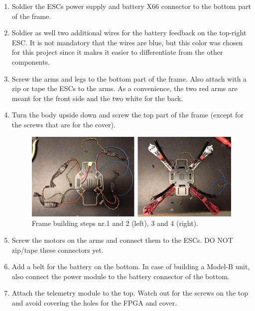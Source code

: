 \begin{enumerate}
    \item Soldier the ESCs power supply and battery X66 connector to the bottom part of the frame.
    
    \item Soldier as well two additional wires for the battery feedback on the top-right ESC. It is not mandatory that the wires are blue, but this color was chosen for this project since it makes it easier to differentiate from the other components.
    
    \item Screw the arms and legs to the bottom part of the frame. Also attach with a zip or tape the ESCs to the arms. As a convenience, the two red arms are meant for the front side and the two white for the back.
    
    \item Turn the body upside down and screw the top part of the frame (except for the screws that are for the cover).
    
\begin{figure} [H]
    \centering
    \includegraphics[width=\textwidth]{Figures/build/frame_123.png}
    \caption{Frame building steps nr.1 and 2 (left), 3 and 4 (right).}
    \label{fig:build_frame1234}
\end{figure}
    
    \item Screw the motors on the arms and connect them to the ESCs. DO NOT zip/tape these connectors yet.
    
    \item Add a belt for the battery on the bottom. In case of building a Model-B unit, also connect the power module to the battery connector of the bottom.
    
    \item Attach the telemetry module to the top. Watch out for the screws on the top and avoid covering the holes for the FPGA and cover.
    

\end{enumerate}
